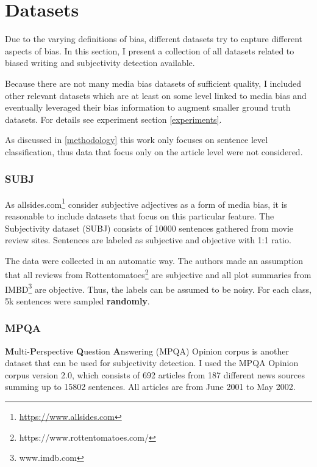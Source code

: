 \chapter{Datasets} \label{datasets}
Due to the varying definitions of bias, different datasets try to capture different aspects of bias. In this section, I present a collection of all datasets related to biased writing and subjectivity detection available.

Because there are not many media bias datasets of sufficient quality, I included other relevant datasets which are at least on some level linked to media bias and eventually leveraged their bias information to augment smaller ground truth datasets. For details see experiment section \ref{experiments}.

As discussed in \ref{methodology} this work only focuses on sentence level classification, thus data that focus only on the article level were not considered.



\subsection{SUBJ}
As allsides.com\footnote{\url{https://www.allsides.com}} consider subjective adjectives as a form of media bias, it is reasonable to include datasets that focus on this particular feature. The Subjectivity dataset (SUBJ) \cite{Pang+Lee:04a} consists of 10000 sentences gathered from movie review sites. Sentences are labeled as subjective and objective with 1:1 ratio. 

The data were collected in an automatic way. The authors made an assumption that all reviews from Rottentomatoes\footnote{https://www.rottentomatoes.com/} are subjective and all plot summaries from IMBD\footnote{ www.imdb.com} are objective. Thus, the labels can be assumed to be noisy. For each class, 5k sentences were sampled \textbf{randomly}.




\subsection{MPQA}
\textbf{M}ulti-\textbf{P}erspective \textbf{Q}uestion \textbf{A}nswering (MPQA) Opinion corpus is another dataset that can be used for subjectivity detection. I used the MPQA Opinion corpus version 2.0, which consists of 692 articles from 187 different news sources summing up to 15802 sentences. All articles are from June 2001 to May 2002.

